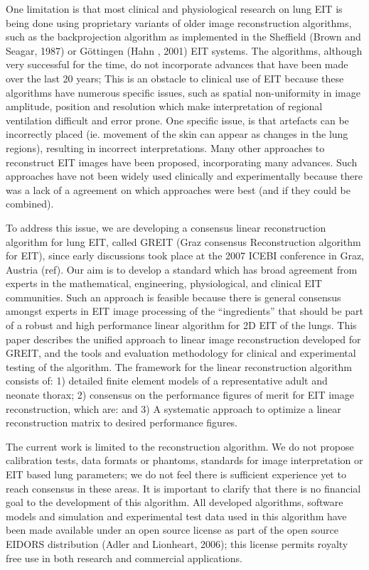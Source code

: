 \documentclass[12pt]{iopart}
\begin{document}
One limitation is that most clinical and physiological research
on lung EIT is being done using proprietary variants of
older image reconstruction algorithms, such as the backprojection
algorithm as implemented
in the Sheffield (Brown and Seagar, 1987)
or G\"ottingen (Hahn \etal, 2001) EIT systems.
The algorithms, although very successful for the time,
   do not incorporate advances that have been made over the last
   20 years;
This is an obstacle to clinical use of EIT because
these algorithms have numerous specific issues, such
   as spatial non-uniformity in image amplitude, position
   and resolution which make interpretation of regional
   ventilation difficult and error prone.
One specific issue, is that 
artefacts can be incorrectly placed (ie. movement of
   the skin can appear as changes in the lung regions),
   resulting in incorrect interpretations.
Many other approaches to reconstruct EIT images have been
proposed, incorporating many advances. Such approaches
have not been widely used clinically and experimentally
because there was a lack of a agreement on which
approaches were best (and if they could be combined).

To address this issue, we are developing a
consensus linear reconstruction algorithm for lung EIT,
called GREIT (Graz consensus Reconstruction algorithm for EIT),
since early discussions took place at the 2007 ICEBI conference
in Graz, Austria (ref). Our aim is to develop a standard which
has broad agreement from experts in the mathematical,
engineering, physiological, and clinical EIT communities.
Such an approach is feasible because there is general
consensus amongst experts in EIT image processing of
the ``ingredients'' that should
be part of a robust and high performance linear algorithm
for 2D EIT of the lungs.
This paper describes the unified approach to 
linear image reconstruction developed for GREIT,
and the tools and evaluation methodology for
clinical and experimental testing of the algorithm.
The framework for the linear reconstruction algorithm
consists of:
1) detailed finite element models of a representative
 adult and neonate thorax;
2) consensus on the performance figures of merit for
 EIT image reconstruction, which are:
and
3) A systematic approach to optimize a linear reconstruction
 matrix to desired performance figures.

The current work is limited to the reconstruction algorithm.
We do not propose calibration tests, data formats or phantoms, standards
for image interpretation or EIT based lung parameters; 
we do not feel there is sufficient experience yet to reach
consensus in these areas.
It is important to clarify that there is no financial
goal to the development of this algorithm.
All developed algorithms, software
models and simulation and experimental test data used
in this algorithm have been
made available under an open source license as part of
the open source EIDORS distribution (Adler and Lionheart, 2006);
this license permits
royalty free use in both research and commercial applications.
\end{document}
